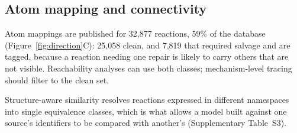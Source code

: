\subsection{Atom mapping and connectivity}\label{sec:results-mapping}

Atom mappings are published for 32,877 reactions, 59\% of the database
(Figure~\ref{fig:direction}C): 25,058 clean, and 7,819 that required salvage
and are tagged, because a reaction needing one repair is likely to carry others
that are not visible. Reachability analyses can use both classes;
mechanism-level tracing should filter to the clean set.

Structure-aware similarity resolves reactions expressed in different namespaces
into single equivalence classes, which is what allows a model built against one
source's identifiers to be compared with another's (Supplementary Table~S3).
